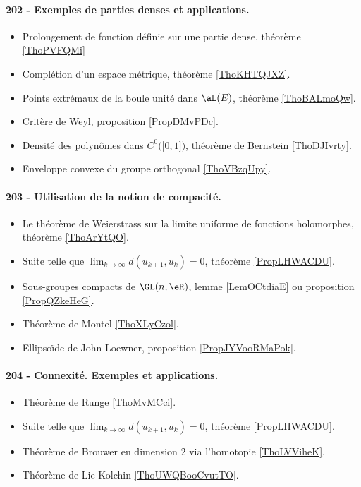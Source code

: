 \paragraph{202 - Exemples de parties denses et applications.}
\begin{itemize}
    \item Prolongement de fonction définie sur une partie dense, théorème \ref{ThoPVFQMi}
    \item Complétion d'un espace métrique, théorème \ref{ThoKHTQJXZ}.
    \item Points extrémaux de la boule unité dans \( \aL(E)\), théorème \ref{ThoBALmoQw}.
    \item Critère de Weyl, proposition \ref{PropDMvPDc}.
    \item Densité des polynômes dans \( C^0\big( \mathopen[ 0 , 1 \mathclose] \big)\), théorème de Bernstein \ref{ThoDJIvrty}.
    \item Enveloppe convexe du groupe orthogonal \ref{ThoVBzqUpy}.
\end{itemize}
\paragraph{203 - Utilisation de la notion de compacité.}
\begin{itemize}
    \item Le théorème de Weierstrass sur la limite uniforme de fonctions holomorphes, théorème \ref{ThoArYtQO}.
    \item Suite telle que \( \lim_{k\to \infty} d(u_{k+1},u_k)=0\), théorème \ref{PropLHWACDU}.
    \item Sous-groupes compacts de \( \GL(n,\eR)\), lemme \ref{LemOCtdiaE} ou proposition \ref{PropQZkeHeG}.
    \item Théorème de Montel \ref{ThoXLyCzol}.
    \item Ellipsoïde de John-Loewner, proposition \ref{PropJYVooRMaPok}.
\end{itemize}
\paragraph{204 - Connexité. Exemples et applications.}
\begin{itemize}
    \item Théorème de Runge \ref{ThoMvMCci}.
    \item Suite telle que \( \lim_{k\to \infty} d(u_{k+1},u_k)=0\), théorème \ref{PropLHWACDU}.
    \item Théorème de Brouwer en dimension \( 2\) via l'homotopie \ref{ThoLVViheK}.
    \item Théorème de Lie-Kolchin \ref{ThoUWQBooCvutTO}.
\end{itemize}
